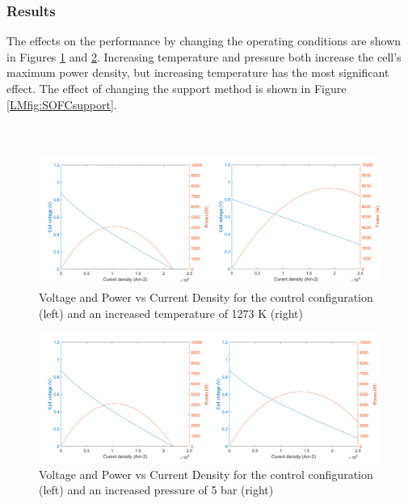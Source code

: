 \documentclass{article}
\begin{document}
    \subsubsection{Results}
    The effects on the performance by changing the operating conditions are shown in Figures \ref{LMfig:SOFCtempinc} and \ref{LMfig:SOFCpresinc}. Increasing temperature and pressure both increase the cell's maximum power density, but increasing temperature has the most significant effect.
    The effect of changing the support method is shown in Figure \ref{LMfig:SOFCsupport}. \\ \\ \\
    
    
    \begin{figure}[h]
        \centering
        \includegraphics[width=1\textwidth]{controlvsinc_temp.png}
        \caption{Voltage and Power vs Current Density for the control configuration (left) and an increased temperature of 1273 K (right)}
        \label{LMfig:SOFCtempinc}
    \end{figure}
    
      
      \begin{figure}[h]
        \centering
        \includegraphics[width=1\textwidth]{controlvsinc_pres.png}
        \caption{Voltage and Power vs Current Density for the control configuration (left) and an increased pressure of 5 bar (right)}
        \label{LMfig:SOFCpresinc}
    \end{figure}
    
\end{document}
